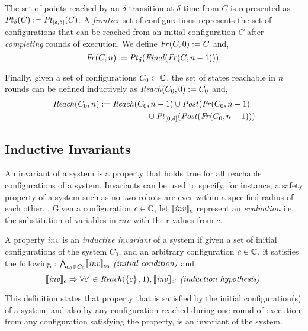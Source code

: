 The set of points reached by an $\delta$-transition at $\delta$ time from $C$ is represented as $\mathit{Pt}_{\delta}(C) := \mathit{Pt}_{[\delta,\delta]}(C)$. A \emph{frontier} set of configurations represents the set of configurations that can be reached from an initial configuration $C$ after \emph{completing} rounds of execution. We define $\mathit{Fr}(C,0) := C$ and,
$$\mathit{Fr}(C,n) := \mathit{Pt}_{\delta}(\mathit{Final}(\mathit{Fr}(C,n-1))).$$

Finally, given a set of configurations $C_0\subset\mathbb{C}$, the set of states reachable in $n$ rounds can be defined inductively as $\mathit{Reach}(C_0,0) := C_0$ and,
\begin{align*}
\mathit{Reach}(C_0,n) := \mathit{Reach}(C_0 &,n-1) \cup \mathit{Post}(\mathit{Fr}(C_0,n-1) \\ &\cup \mathit{Pt}_{[0,\delta]}(\mathit{Post}(\mathit{Fr}(C_0,n-1)))
\end{align*}



\subsection{Inductive Invariants}
An invariant of a system is a property that holds true for all reachable configurations of a system. Invariants can be used to specify, for instance, a safety property of a system such as no two robots are ever within a specified radius of each other. .
Given a configuration $c \in \mathbb{C}$, let $\llbracket\mathit{inv}\rrbracket_{c}$ represent an \emph{evaluation} i.e. the substitution of variables in $\mathit{inv}$ with their values from $c$.

\begin{definition}
\label{def:ii}
A property $\mathit{inv}$ is an \emph{inductive invariant} of a system if given a set of initial configurations of the system $C_0$, and an arbitrary configuration $c\in \mathbb{C}$, it satisfies the following :
$\bigwedge_{c_0\in C_0} \llbracket\mathit{inv}\rrbracket_{c_0}\mbox{\textit{ (initial condition)}}$ and
$$\llbracket\mathit{inv}\rrbracket_{c} \Rightarrow \forall c' \in \mathit{Reach}(\left\{c\right\},1), \llbracket\mathit{inv}\rrbracket_{c'} \mbox{\textit{ (induction hypothesis)}}.$$
\end{definition}
This definition states that property that is satisfied by the initial configuration(s) of a system, and also by any configuration reached during one round of execution from any configuration satisfying the property, is an invariant of the system.



